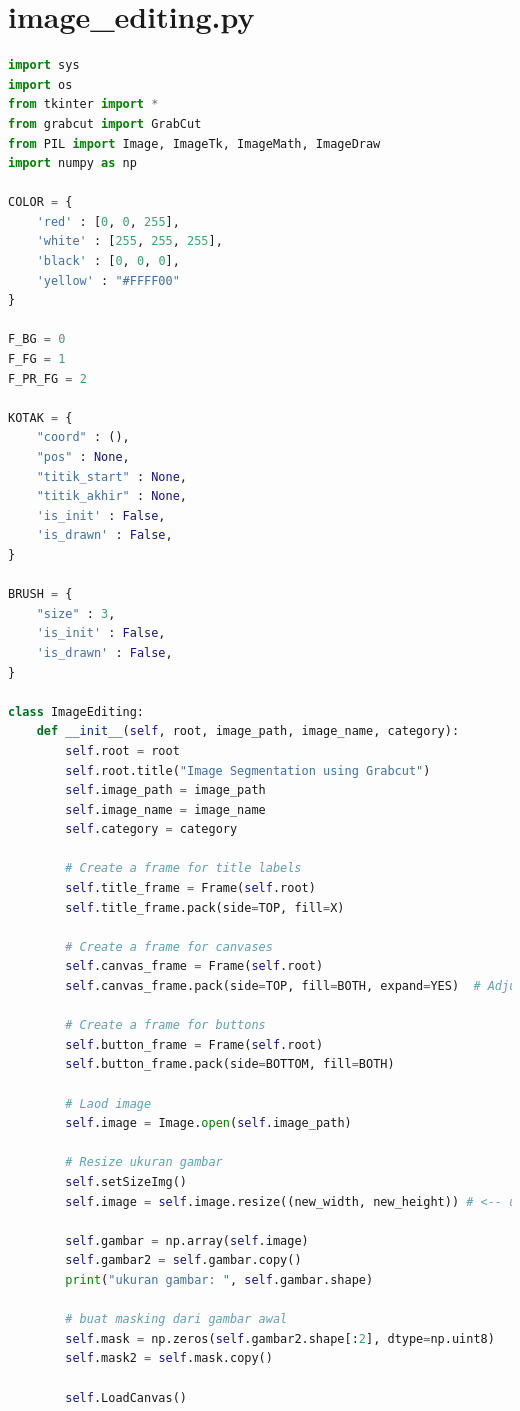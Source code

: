 \section{image\_editing.py}
\begin{lstlisting}[language=Python, basicstyle=\tiny]
import sys
import os
from tkinter import *
from grabcut import GrabCut
from PIL import Image, ImageTk, ImageMath, ImageDraw
import numpy as np

COLOR = {
    'red' : [0, 0, 255],
    'white' : [255, 255, 255],
    'black' : [0, 0, 0],
    'yellow' : "#FFFF00"
}

F_BG = 0
F_FG = 1
F_PR_FG = 2

KOTAK = {
    "coord" : (),
    "pos" : None,
    "titik_start" : None,
    "titik_akhir" : None,
    'is_init' : False,
    'is_drawn' : False,
}

BRUSH = {
    "size" : 3,
    'is_init' : False,
    'is_drawn' : False,
}

class ImageEditing:
    def __init__(self, root, image_path, image_name, category):
        self.root = root
        self.root.title("Image Segmentation using Grabcut")   
        self.image_path = image_path    
        self.image_name = image_name
        self.category = category

        # Create a frame for title labels
        self.title_frame = Frame(self.root)
        self.title_frame.pack(side=TOP, fill=X)

        # Create a frame for canvases
        self.canvas_frame = Frame(self.root)
        self.canvas_frame.pack(side=TOP, fill=BOTH, expand=YES)  # Adjusted to fill both X and Y, expand

        # Create a frame for buttons
        self.button_frame = Frame(self.root)
        self.button_frame.pack(side=BOTTOM, fill=BOTH)

        # Laod image
        self.image = Image.open(self.image_path)

        # Resize ukuran gambar
        self.setSizeImg() 
        self.image = self.image.resize((new_width, new_height)) # <-- untuk resize ukuran

        self.gambar = np.array(self.image)
        self.gambar2 = self.gambar.copy()
        print("ukuran gambar: ", self.gambar.shape)

        # buat masking dari gambar awal
        self.mask = np.zeros(self.gambar2.shape[:2], dtype=np.uint8)
        self.mask2 = self.mask.copy()

        self.LoadCanvas()


\end{lstlisting}
